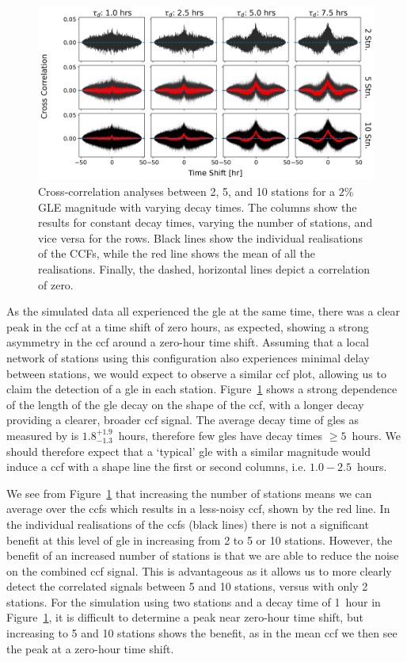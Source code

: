 \begin{figure}[ht!]
	\centering
	\includegraphics[width=\columnwidth]{HS_14008_sims_CCF_2pc_plot.png}
	\caption{Cross-correlation analyses between 2, 5, and 10 stations for a $2\%$ GLE magnitude with varying decay times. The columns show the results for constant decay times, varying the number of stations, and vice versa for the rows. Black lines show the individual realisations of the CCFs, while the red line shows the mean of all the realisations. Finally, the dashed, horizontal lines depict a correlation of zero.}
	\label{fig:HS_14008_2pc_sim_CCFs}
\end{figure}

As the simulated data all experienced the \gls{gle} at the same time, there was a clear peak in the \gls{ccf} at a time shift of zero hours, as expected, showing a strong asymmetry in the \gls{ccf} around a zero-hour time shift. Assuming that a local network of stations using this configuration also experiences minimal delay between stations, we would expect to observe a similar \gls{ccf} plot, allowing us to claim the detection of a \gls{gle} in each station. Figure~\ref{fig:HS_14008_2pc_sim_CCFs} shows a strong dependence of the length of the \gls{gle} decay on the shape of the \gls{ccf}, with a longer decay providing a clearer, broader \gls{ccf} signal. The average decay time of \glspl{gle} as measured by \citet{strauss_pulse_2017} is $1.8^{+1.9}_{-1.3}$~hours, therefore few \glspl{gle} have decay times $\geq 5$~hours. We should therefore expect that a `typical' \gls{gle} with a similar magnitude would induce a \gls{ccf} with a shape line the first or second columns, i.e. $1.0-2.5$~hours. 

We see from Figure~\ref{fig:HS_14008_2pc_sim_CCFs} that increasing the number of stations means we can average over the \glspl{ccf} which results in a less-noisy \gls{ccf}, shown by the red line. In the individual realisations of the \glspl{ccf} (black lines) there is not a significant benefit at this level of \gls{gle} in increasing from 2 to 5 or 10 stations. However, the benefit of an increased number of stations is that we are able to reduce the noise on the combined \gls{ccf} signal. This is advantageous as it allows us to more clearly detect the correlated signals between 5 and 10 stations, versus with only 2 stations. For the simulation using two stations and a decay time of 1~hour in Figure~\ref{fig:HS_14008_2pc_sim_CCFs}, it is difficult to determine a peak near zero-hour time shift, but increasing to 5 and 10 stations shows the benefit, as in the mean \gls{ccf} we then see the peak at a zero-hour time shift. 

